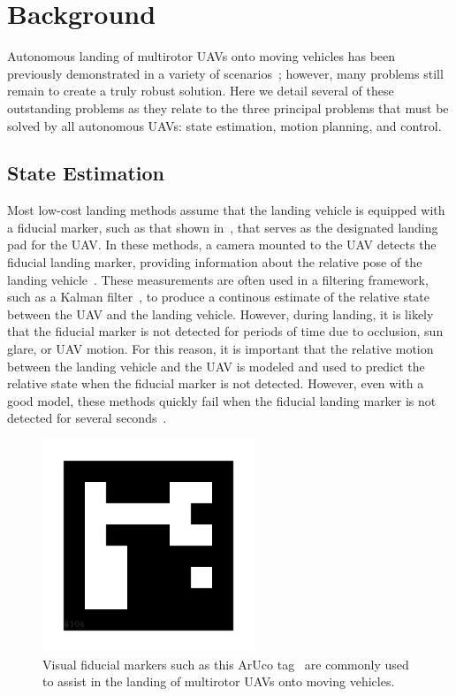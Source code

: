 \section{Background}

Autonomous landing of multirotor UAVs onto moving vehicles has been previously
demonstrated in a variety of scenarios~\cite{wynn2019visual}; however, many problems still remain to
create a truly robust solution. Here we detail several of these outstanding
problems as they relate to the three principal problems that must be solved by
all autonomous UAVs: state estimation, motion planning, and control.

\subsection{State Estimation}
Most low-cost landing methods assume that the landing vehicle is equipped with a
fiducial marker, such as that shown in~, that serves as
the designated landing pad for the UAV.
In these methods, a camera mounted to the UAV detects the fiducial landing marker, providing
information about the relative pose of the landing
vehicle~\cite{borowczyk2017autonomous}. These measurements are often used in a
filtering framework, such as a Kalman filter~\cite{kalman}, to produce a
continous estimate of the relative state between the UAV and the landing
vehicle. However, during landing, it is likely
that the fiducial marker is not detected for periods of time due to occlusion,
sun glare, or UAV motion. For this reason, it is important that the relative
motion between the landing vehicle and the UAV is modeled and used to predict
the relative state when the fiducial marker is not detected.
However, even with a good model,
these methods quickly fail when the fiducial landing
marker is not detected for several seconds~\cite{ling2014precision}.

\begin{figure}[h]
  \centering
  \includegraphics[width=2.5in]{figures/aruco_104.png}
  \caption[Visual Fiducial Landing Marker]{Visual fiducial markers such as this
    ArUco tag~\cite{garrido2016generation} are commonly used to assist in the
  landing of multirotor UAVs onto moving vehicles.}
  \label{fig:aruco_tag}
\end{figure}

